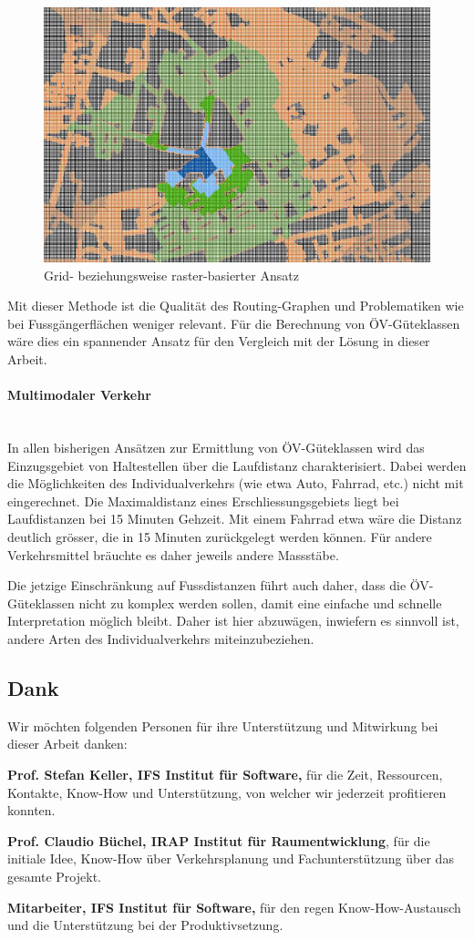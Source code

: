 \begin{figure}[ht]
    \centering
    \includegraphics[width=0.6\linewidth]{start/img/grid_based_approach.png}
    \caption[Grid- beziehungsweise raster-basierter Ansatz]{Grid- beziehungsweise raster-basierter Ansatz~\cite{pedestrian_accessibility_planning}}
    \label{fig:grid_based_approach}
\end{figure}

Mit dieser Methode ist die Qualität des Routing-Graphen und Problematiken wie bei Fussgängerflächen weniger relevant.
Für die Berechnung von \acs{ÖV}-Güteklassen wäre dies ein spannender Ansatz für den Vergleich mit der Lösung in dieser Arbeit.

\paragraph{Multimodaler Verkehr}~\\
In allen bisherigen Ansätzen zur Ermittlung von \acs{ÖV}-Güteklassen wird das Einzugsgebiet von Haltestellen über die Laufdistanz charakterisiert.
Dabei werden die Möglichkeiten des Individualverkehrs (wie etwa Auto, Fahrrad, etc.) nicht mit eingerechnet.
Die Maximaldistanz eines Erschliessungsgebiets liegt bei Laufdistanzen bei 15 Minuten Gehzeit.
Mit einem Fahrrad etwa wäre die Distanz deutlich grösser, die in 15 Minuten zurückgelegt werden können.
Für andere Verkehrsmittel bräuchte es daher jeweils andere Massstäbe.

Die jetzige Einschränkung auf Fussdistanzen führt auch daher, dass die \acs{ÖV}-Güteklassen nicht zu komplex werden sollen, damit eine einfache und schnelle Interpretation möglich bleibt.
Daher ist hier abzuwägen, inwiefern es sinnvoll ist, andere Arten des Individualverkehrs miteinzubeziehen.

\subsection{Dank}
\label{Resultate:Dank}

Wir möchten folgenden Personen für ihre Unterstützung und Mitwirkung bei dieser Arbeit danken:

\textbf{Prof. Stefan Keller, IFS Institut für Software,} für die Zeit, Ressourcen, Kontakte, Know-How und Unterstützung, von welcher wir jederzeit profitieren konnten.

\textbf{Prof. Claudio Büchel, IRAP Institut für Raumentwicklung}, für die initiale Idee, Know-How über Verkehrsplanung und Fachunterstützung über das gesamte Projekt.

\textbf{Mitarbeiter, IFS Institut für Software,} für den regen Know-How-Austausch und die Unterstützung bei der Produktivsetzung.

